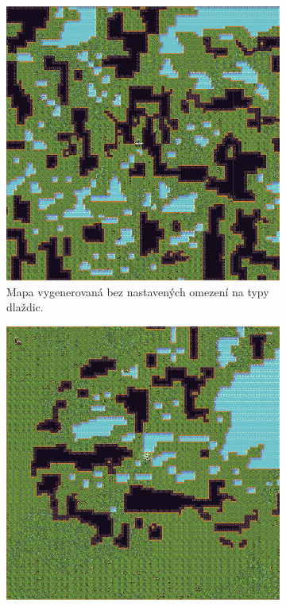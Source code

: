 \begin{figure}[H]
	\centering
	\begin{subfigure}{0.475\textwidth}
		\centering
		\includegraphics[scale=0.4]{obrazky-figures/WFCNonrestricted.png}
		\caption{Mapa vygenerovaná bez nastavených omezení na typy dlaždic.}
		\label{WFCNonRestricted}
	\end{subfigure}
	\begin{subfigure}{0.475\textwidth}
		\centering
		\includegraphics[scale=0.4]{obrazky-figures/WFCRestricted.png}

\end{subfigure}
\end{figure}
